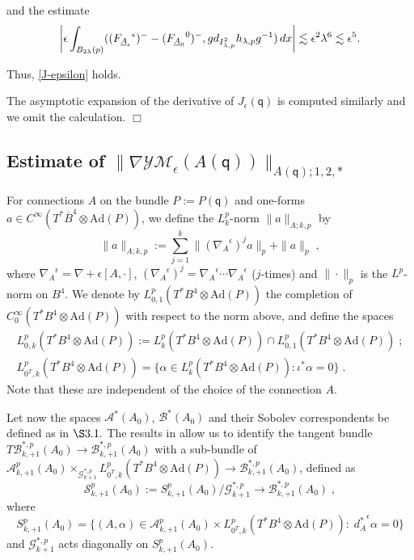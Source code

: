 \documentclass[11pt]{article}
\numberwithin{equation}{section} \setlength{\topmargin}{-35pt}
\newcommand{\Ad}{\text{Ad}}
\newcommand{\YMe}{\mathcal{YM}_{\epsilon}}
\newcommand{\q}{\mathsf{q}}
\begin{document}
\noindent  and the estimate
\begin{equation}
\notag
\biggl|\epsilon\int_{B_{2\lambda}(p)}(({F_{\underline{A}_{\epsilon}}}^{\epsilon})^-
- ({F_{\underline A_{0}}}^0)^-,
gd_{I^2_{\lambda,p}}h_{\lambda,p}g^{-1})\,dx \biggr| \lesssim
\epsilon^2\lambda^6\lesssim \epsilon^5.
\end{equation}

\noindent Thus, \eqref{J-epsilon} holds.

\medskip

\noindent The asymptotic expansion of the derivative of
$J_{\epsilon}(\q)$ is computed similarly and we omit the
calculation. \hfill$\Box$

\subsection{Estimate of $\|\nabla\YMe(A(\q))\|_{A(\q);1,2,\ast}$}
For connections $A$ on the bundle $P:=P(\q)$ and one-forms $a\in
C^{\infty}(T^{\ast}\overline{B}^4\otimes\Ad(P))$, we define the
$L^p_k$-norm $\|a\|_{A;k,p}$ by
\begin{equation}
\label{norm}
\|a\|_{A;k,p}:=\sum_{j=1}^k\|({\nabla_A}^{\epsilon})^ja\|_p+\|a\|_p\;,
\end{equation}
where ${\nabla_A}^{\epsilon}=\nabla+\epsilon[A,\cdot]$,
$({\nabla_A}^{\epsilon})^j={\nabla_A}^{\epsilon}\cdots{\nabla_A}^{\epsilon}$
($j$-times) and $\|\cdot\|_p$ is the $L^p$-norm on $B^4$. We denote
by $L^p_{0,1}(T^{\ast}B^4\otimes\Ad(P))$ the completion of
$C^{\infty}_0(T^{\ast}B^4\otimes\Ad(P))$ with respect to the norm
above, and define the spaces
\begin{align*}
L^p_{0,k}(T^{\ast}B^4\otimes\Ad(P)):=L^p_k(T^{\ast}B^4\otimes\Ad(P))\cap
L^p_{0,1}(T^{\ast}B^4\otimes\Ad(P))\;;\\
L^p_{0^T,k}(T^{\ast}B^4\otimes\Ad(P))=\{\alpha\in
L^p_k(T^{\ast}B^4\otimes\Ad(P)):\iota^{\ast}\alpha=0\}\;.
\end{align*} Note that these are independent of the choice of
the connection $A$.

Let now the spaces $\mathcal{A}^\ast(A_0)$, $\mathcal{B}^\ast(A_0)$
and their Sobolev correspondents be defined as in $\S3.1.$ The
results in \cite{IM3} allow us to identify the tangent bundle
$T\mathcal{B}^{\ast,p}_{k,+1}(A_0)\to\mathcal{B}^{\ast,p}_{k,+1}(A_0)$
with a sub-bundle of
$\mathcal{A}^p_{k,+1}(A_0)\times_{\mathcal{G}^{\ast,p}_{k+1}}L^p_{0^T,k}(T^{\ast}B^4\otimes\Ad(P))
\to\mathcal{B}^{\ast,p}_{k,+1}(A_0)$, defined as
$$\mathcal{S}^p_{k,+1}(A_0):=S^p_{k,+1}(A_0)/\mathcal{G}^{\ast,p}_{k+1}\to\mathcal{B}^{\ast,p}_{k,+1}(A_0)\;,$$
where
$$S^p_{k,+1}(A_0)=\{(A,\alpha)\in\mathcal{A}^p_{k,+1}(A_0)\times L^p_{0^T,k}(T^{\ast}B^4\otimes\Ad(P)):\;{d_A^{\ast}}^{\epsilon}\alpha=0\}$$
and $\mathcal{G}^{\ast,p}_{k+1}$ acts diagonally on
$S^p_{k,+1}(A_0)$.
\end{document}
